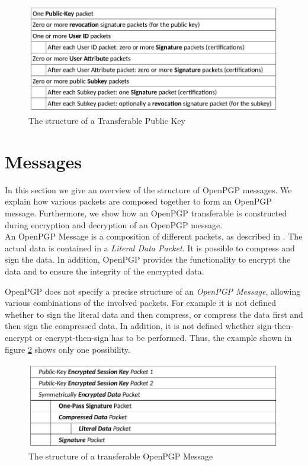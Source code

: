 \begin{figure}[h]
	\centering
	\includegraphics[width=1\linewidth]{figures/transferable-key.png}
	\caption{The structure of a Transferable Public Key}
	\label{fig:transferable-key}
\end{figure}

\section{Messages}
\label{section:messageformat:messages}

In this section we give an overview of the structure of OpenPGP messages. We explain how various packets are composed together to form an OpenPGP message. Furthermore, we show how an OpenPGP transferable is constructed during encryption and decryption of an OpenPGP message. \\

An OpenPGP Message is a composition of different packets, as described in \cite[section 11.3]{RFC4880}. The actual data is contained in a \textit{Literal Data Packet}. It is possible to compress and sign the data. In addition, OpenPGP provides the functionality to encrypt the data and to ensure the integrity of the encrypted data.

OpenPGP does not specify a precise structure of an \textit{OpenPGP Message}, allowing various combinations of the involved packets. For example it is not defined whether to sign the literal data and then compress, or compress the data first and then sign the compressed data. In addition, it is not defined whether sign-then-encrypt or encrypt-then-sign has to be performed. Thus, the example shown in figure \ref{fig:transferable-msg} shows only one possibility.

\begin{figure}[h!]
	\centering
	\includegraphics[width=1\linewidth]{figures/transferable-msg.png}
	\caption{The structure of a transferable OpenPGP Message}
	\label{fig:transferable-msg}
\end{figure}



